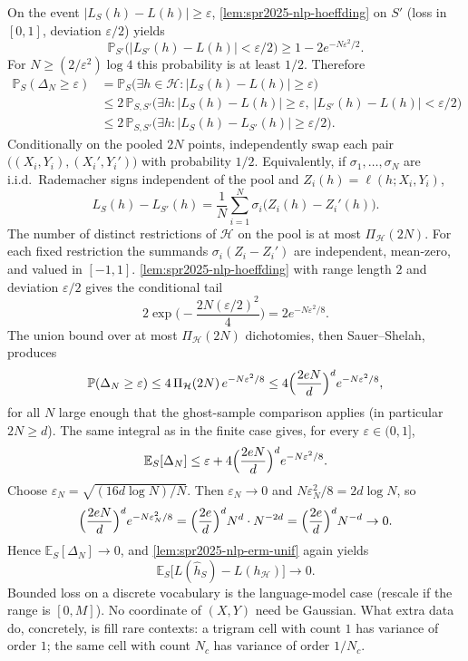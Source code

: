 \documentclass[11pt,a4paper]{article}
\theoremstyle{definition}
\begin{document}
On the event \(\lvert L_S(h)-L(h)\rvert\ge\varepsilon\), \cref{lem:spr2025-nlp-hoeffding} on \(S'\) (loss in \([0,1]\), deviation \(\varepsilon/2\)) yields
\[
\mathbb{P}_{S'}\bigl(\lvert L_{S'}(h)-L(h)\rvert<\varepsilon/2\bigr)
\ge
1-2e^{-N\varepsilon^2/2}.
\]
For \(N\ge(2/\varepsilon^2)\log 4\) this probability is at least \(1/2\). Therefore
\begin{align*}
\mathbb{P}_S(\Delta_N\ge\varepsilon)
&=\mathbb{P}_S\bigl(\exists h\in\mathcal{H}:\lvert L_S(h)-L(h)\rvert\ge\varepsilon\bigr)
\\
&\le
2\,\mathbb{P}_{S,S'}\bigl(\exists h:\lvert L_S(h)-L(h)\rvert\ge\varepsilon,\ \lvert L_{S'}(h)-L(h)\rvert<\varepsilon/2\bigr)
\\
&\le
2\,\mathbb{P}_{S,S'}\bigl(\exists h:\lvert L_S(h)-L_{S'}(h)\rvert\ge\varepsilon/2\bigr).
\end{align*}
Conditionally on the pooled \(2N\) points, independently swap each pair \(\bigl((X_i,Y_i),(X_i',Y_i')\bigr)\) with probability \(1/2\). Equivalently, if \(\sigma_1,\ldots,\sigma_N\) are i.i.d.\ Rademacher signs independent of the pool and \(Z_i(h)=\ell(h;X_i,Y_i)\),
\[
L_S(h)-L_{S'}(h)
=\frac{1}{N}\sum_{i=1}^{N}\sigma_i\bigl(Z_i(h)-Z_i'(h)\bigr).
\]
The number of distinct restrictions of \(\mathcal{H}\) on the pool is at most \(\Pi_{\mathcal{H}}(2N)\). For each fixed restriction the summands \(\sigma_i(Z_i-Z_i')\) are independent, mean-zero, and valued in \([-1,1]\). \cref{lem:spr2025-nlp-hoeffding} with range length \(2\) and deviation \(\varepsilon/2\) gives the conditional tail
\[
2\exp\Biggl(-\frac{2N(\varepsilon/2)^2}{4}\Biggr)
=2e^{-N\varepsilon^2/8}.
\]
The union bound over at most \(\Pi_{\mathcal{H}}(2N)\) dichotomies, then Sauer--Shelah, produces
\[
\mathbb{P}(\Delta_N\ge\varepsilon)
\le
4\,\Pi_{\mathcal{H}}(2N)\,e^{-N\varepsilon^2/8}
\le
4\Bigl(\frac{2eN}{d}\Bigr)^d e^{-N\varepsilon^2/8},
\]
for all \(N\) large enough that the ghost-sample comparison applies (in particular \(2N\ge d\)). The same integral as in the finite case gives, for every \(\varepsilon\in(0,1]\),
\[
\mathbb{E}_S[\Delta_N]
\le
\varepsilon+4\Bigl(\frac{2eN}{d}\Bigr)^d e^{-N\varepsilon^2/8}.
\]
Choose \(\varepsilon_N=\sqrt{(16d\log N)/N}\). Then \(\varepsilon_N\to 0\) and \(N\varepsilon_N^2/8=2d\log N\), so
\[
\Bigl(\frac{2eN}{d}\Bigr)^d e^{-N\varepsilon_N^2/8}
=\Bigl(\frac{2e}{d}\Bigr)^d N^d\cdot N^{-2d}
=\Bigl(\frac{2e}{d}\Bigr)^d N^{-d}\to 0.
\]
Hence \(\mathbb{E}_S[\Delta_N]\to 0\), and \cref{lem:spr2025-nlp-erm-unif} again yields
\[
\mathbb{E}_S\bigl[L(\widehat h_S)-L(h_{\mathcal{H}})\bigr]\to 0.
\]
Bounded loss on a discrete vocabulary is the language-model case (rescale if the range is \([0,M]\)). No coordinate of \((X,Y)\) need be Gaussian. What extra data do, concretely, is fill rare contexts: a trigram cell with count \(1\) has variance of order \(1\); the same cell with count \(N_c\) has variance of order \(1/N_c\).
\end{document}
